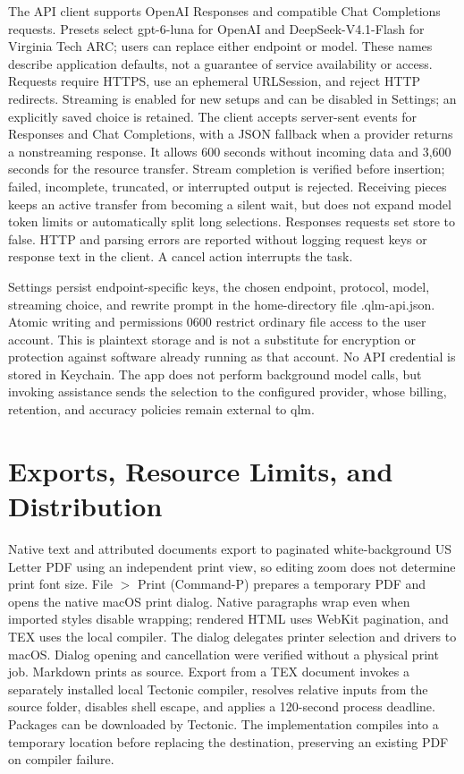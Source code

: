 \documentclass[manuscript,screen,nonacm]{acmart}
\begin{document}
The API client supports OpenAI Responses and compatible Chat Completions requests. Presets select gpt-6-luna for OpenAI and DeepSeek-V4.1-Flash for Virginia Tech ARC; users can replace either endpoint or model. These names describe application defaults, not a guarantee of service availability or access. Requests require HTTPS, use an ephemeral URLSession, and reject HTTP redirects. Streaming is enabled for new setups and can be disabled in Settings; an explicitly saved choice is retained. The client accepts server-sent events for Responses and Chat Completions, with a JSON fallback when a provider returns a nonstreaming response. It allows 600 seconds without incoming data and 3,600 seconds for the resource transfer. Stream completion is verified before insertion; failed, incomplete, truncated, or interrupted output is rejected. Receiving pieces keeps an active transfer from becoming a silent wait, but does not expand model token limits or automatically split long selections. Responses requests set store to false. HTTP and parsing errors are reported without logging request keys or response text in the client. A cancel action interrupts the task.

Settings persist endpoint-specific keys, the chosen endpoint, protocol, model, streaming choice, and rewrite prompt in the home-directory file .qlm-api.json. Atomic writing and permissions 0600 restrict ordinary file access to the user account. This is plaintext storage and is not a substitute for encryption or protection against software already running as that account. No API credential is stored in Keychain. The app does not perform background model calls, but invoking assistance sends the selection to the configured provider, whose billing, retention, and accuracy policies remain external to qlm.

\section{Exports, Resource Limits, and Distribution}

Native text and attributed documents export to paginated white-background US Letter PDF using an independent print view, so editing zoom does not determine print font size. File $>$ Print (Command-P) prepares a temporary PDF and opens the native macOS print dialog. Native paragraphs wrap even when imported styles disable wrapping; rendered HTML uses WebKit pagination, and TEX uses the local compiler. The dialog delegates printer selection and drivers to macOS. Dialog opening and cancellation were verified without a physical print job. Markdown prints as source. Export from a TEX document invokes a separately installed local Tectonic compiler, resolves relative inputs from the source folder, disables shell escape, and applies a 120-second process deadline. Packages can be downloaded by Tectonic. The implementation compiles into a temporary location before replacing the destination, preserving an existing PDF on compiler failure.
\end{document}
